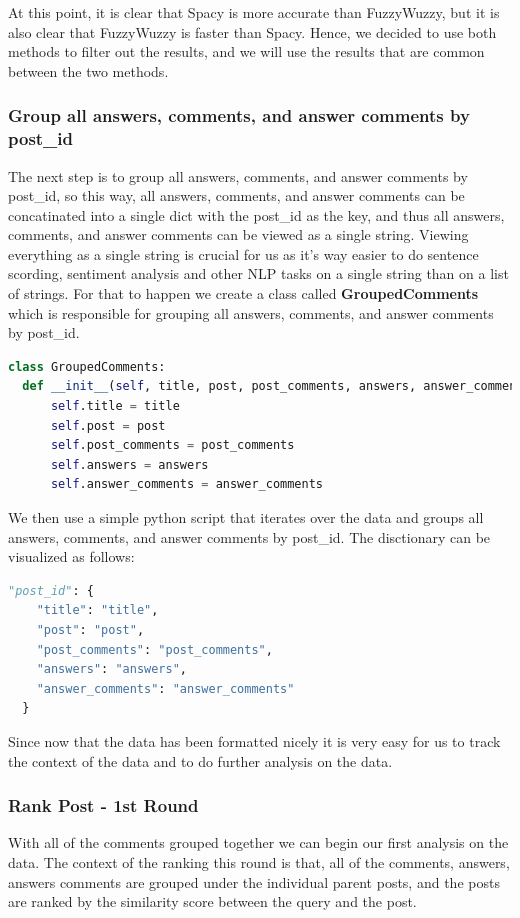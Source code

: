 At this point, it is clear that Spacy is more accurate than FuzzyWuzzy, but it is also clear that FuzzyWuzzy is faster than Spacy. Hence, we decided to use both methods to filter out the results, and we will use the results that are common between the two methods.

\subsubsection{Group all answers, comments, and answer comments by post\_id} \label{grouped_by_post}

The next step is to group all answers, comments, and answer comments by post\_id, so this way, all answers, comments, and answer comments can be concatinated into a single dict with the post\_id as the key, and thus all answers, comments, and answer comments can be viewed as a single string. Viewing everything as a single string is crucial for us as it's way easier to do sentence scording, sentiment analysis and other NLP tasks on a single string than on a list of strings. For that to happen we create a class called \textbf{GroupedComments} which is responsible for grouping all answers, comments, and answer comments by post\_id.

\begin{lstlisting}[language=Python]
class GroupedComments: 
  def __init__(self, title, post, post_comments, answers, answer_comments): 
      self.title = title
      self.post = post
      self.post_comments = post_comments
      self.answers = answers
      self.answer_comments = answer_comments
\end{lstlisting}

We then use a simple python script that iterates over the data and groups all answers, comments, and answer comments by post\_id. The disctionary can be visualized as follows:

\pagebreak
\begin{lstlisting}[language=Python,caption={Grouped Comments Dictionary Example},captionpos=b]
  "post_id": {
    "title": "title",
    "post": "post",
    "post_comments": "post_comments",
    "answers": "answers",
    "answer_comments": "answer_comments"
  }
\end{lstlisting}

Since now that the data has been formatted nicely it is very easy for us to track the context of the data and to do further analysis on the data.

\subsubsection*{Rank Post - 1st Round}
With all of the comments grouped together we can begin our first analysis on the data. The context of the ranking this round is that, all of the comments, answers, answers comments are grouped under the individual parent posts, and the posts are ranked by the similarity score between the query and the post.

